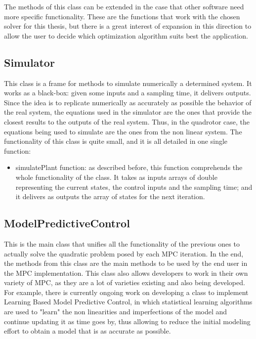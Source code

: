 The methods of this class can be extended in the case that other software need more specific functionality. These are the functions that work with the chosen solver for this thesis, but there is a great interest of expansion in this direction to allow the user to decide which optimization algorithm suits best the application.

\subsection{Simulator}

This class is a frame for methods to simulate numerically a determined system. It works as a black-box: given some inputs and a sampling time, it delivers outputs. Since the idea is to replicate numerically as accurately as possible the behavior of the real system, the equations used in the simulator are the ones that provide the closest results to the outputs of the real system. Thus, in the quadrotor case, the equations being used to simulate are the ones from the non linear system. The functionality of this class is quite small, and it is all detailed in one single function:

\begin{itemize}

\item simulatePlant function: as described before, this function comprehends the whole functionality of the class. It takes as inputs arrays of double representing the current states, the control inputs and the sampling time; and it delivers as outputs the array of states for the next iteration. 

\end{itemize}

\subsection{ModelPredictiveControl}

This is the main class that unifies all the functionality of the previous ones to actually solve the quadratic problem posed by each MPC iteration. In the end, the methods from this class are the main methods to be used by the end user in the MPC implementation. This class also allows developers to work in their own variety of MPC, as they are a lot of varieties existing and also being developed. For example, there is currently ongoing work on developing a class to implement Learning Based Model Predictive Control, in which statistical learning algorithms are used to "learn" the non linearities and imperfections of the model and continue updating it as time goes by, thus allowing to reduce the initial modeling effort to obtain a model that is as accurate as possible. \\

